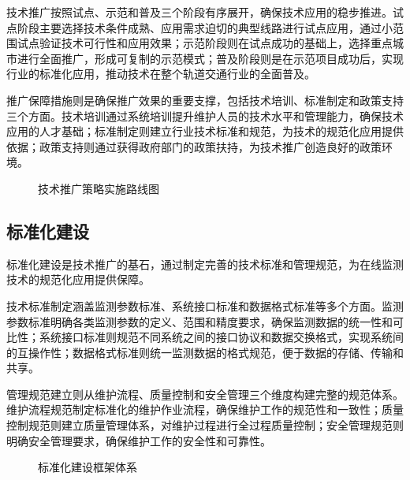 技术推广按照试点、示范和普及三个阶段有序展开，确保技术应用的稳步推进。试点阶段主要选择技术条件成熟、应用需求迫切的典型线路进行试点应用，通过小范围试点验证技术可行性和应用效果；示范阶段则在试点成功的基础上，选择重点城市进行全面推广，形成可复制的示范模式；普及阶段则是在示范项目成功后，实现行业的标准化应用，推动技术在整个轨道交通行业的全面普及。

推广保障措施则是确保推广效果的重要支撑，包括技术培训、标准制定和政策支持三个方面。技术培训通过系统培训提升维护人员的技术水平和管理能力，确保技术应用的人才基础；标准制定则建立行业技术标准和规范，为技术的规范化应用提供依据；政策支持则通过获得政府部门的政策扶持，为技术推广创造良好的政策环境。

\begin{figure}[h]
\centering
\caption{技术推广策略实施路线图}
\label{fig:technology_promotion_strategy}
\end{figure}

\subsection{标准化建设}

标准化建设是技术推广的基石，通过制定完善的技术标准和管理规范，为在线监测技术的规范化应用提供保障。

技术标准制定涵盖监测参数标准、系统接口标准和数据格式标准等多个方面。监测参数标准明确各类监测参数的定义、范围和精度要求，确保监测数据的统一性和可比性；系统接口标准则规范不同系统之间的接口协议和数据交换格式，实现系统间的互操作性；数据格式标准则统一监测数据的格式规范，便于数据的存储、传输和共享。

管理规范建立则从维护流程、质量控制和安全管理三个维度构建完整的规范体系。维护流程规范制定标准化的维护作业流程，确保维护工作的规范性和一致性；质量控制规范则建立质量管理体系，对维护过程进行全过程质量控制；安全管理规范则明确安全管理要求，确保维护工作的安全性和可靠性。

\begin{figure}[h]
\centering
\caption{标准化建设框架体系}
\label{fig:standardization_framework}
\end{figure}